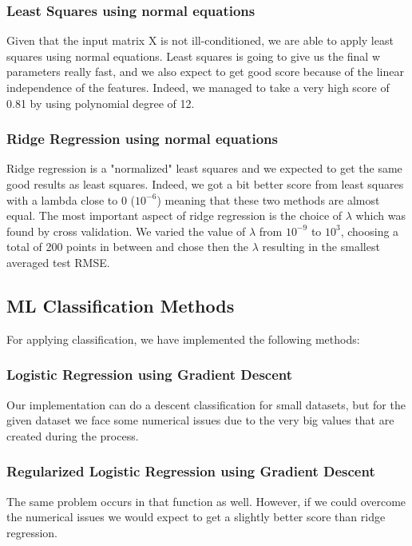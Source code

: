 \documentclass[10pt,conference,compsocconf]{IEEEtran}
\begin{document}
\subsubsection{Least Squares using normal equations}
Given that the input matrix X is not ill-conditioned, we are able to apply least squares using normal equations. Least squares is going to give us the final w parameters really fast, and we also expect to get good score because of the linear independence of the features. Indeed, we managed to take a very high score of 0.81 by using polynomial degree of 12.
\subsubsection{Ridge Regression using normal equations}
Ridge regression is a "normalized" least squares and we expected to get the same good results as least squares. Indeed, we got a bit better score from least squares with a lambda close to 0 ($10^{-6}$) meaning that these two methods are almost equal. The most important aspect of ridge regression is the choice of $\lambda$ which was found by cross validation. We varied the value of $\lambda$ from $10^{-9}$ to $10^{3}$, choosing a total of 200 points in between and chose then the $\lambda$ resulting in the smallest averaged test RMSE.

\subsection{ML Classification Methods}
For applying classification, we have implemented the following methods:
\subsubsection{Logistic Regression using Gradient Descent}
Our implementation can do a descent classification for small datasets, but for the given dataset we face some numerical issues due to the very big values that are created during the process.
\subsubsection{Regularized Logistic Regression using Gradient Descent}
The same problem occurs in that function as well. However, if we could overcome the numerical issues we would expect to get a slightly better score than ridge regression.
\end{document}
